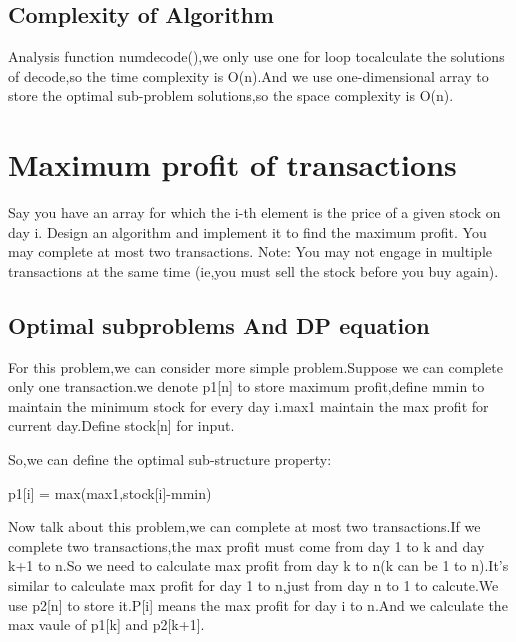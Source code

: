 \documentclass[]{article}
\begin{document}
\subsection{Complexity of Algorithm}
Analysis function numdecode(),we only use one for loop tocalculate the solutions of decode,so the time complexity is O(n).And we use one-dimensional array to
store the optimal sub-problem solutions,so the space complexity is O(n).

\section{Maximum profit of transactions}
Say you have an array for which the i-th element is the price of a given stock on day i.
Design an algorithm and implement it to find the maximum profit. You may complete at most two transactions.
Note: You may not engage in multiple transactions at the same time (ie,you must sell the stock before you buy again).

\subsection{Optimal subproblems And DP equation}
For this problem,we can consider more simple problem.Suppose we can complete only one transaction.we denote p1[n] to store maximum profit,define mmin to maintain the minimum stock for every day i.max1 maintain the max profit for current day.Define stock[n] for input.

So,we can define the optimal sub-structure property:\\

\centerline{p1[i] = max(max1,stock[i]-mmin)}

Now talk about this problem,we can complete at most two transactions.If we complete two
transactions,the max profit must come from day 1 to k and  day k+1 to n.So we need to calculate max profit from day k to n(k can be 1 to n).It's similar to calculate  max profit for day 1 to n,just from day n to 1 to calcute.We use p2[n] to store it.P[i] means the max profit for day i to n.And we calculate the max vaule of p1[k] and p2[k+1].
\end{document}
